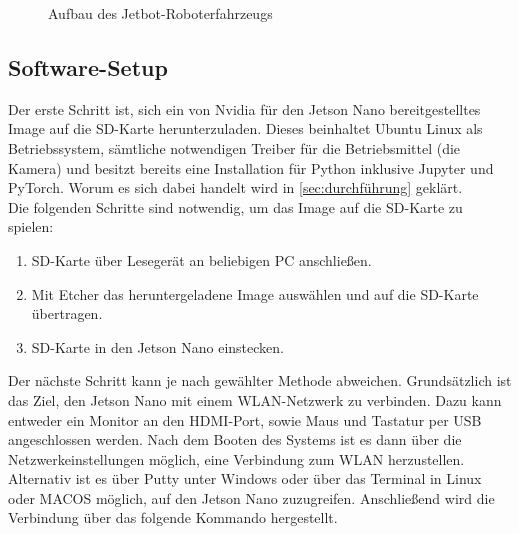 \begin{figure}[H]
    \centering
    \caption[Aufbau Jetbot]{Aufbau des Jetbot-Roboterfahrzeugs}
    \label{fig:Bild3.3}
\end{figure}

\subsection{Software-Setup}

Der erste Schritt ist, sich ein von Nvidia für den Jetson Nano bereitgestelltes Image auf die SD-Karte herunterzuladen. Dieses beinhaltet Ubuntu Linux als Betriebssystem, sämtliche notwendigen Treiber für die Betriebsmittel (\zB die Kamera) und besitzt bereits eine Installation für Python inklusive Jupyter und PyTorch. Worum es sich dabei handelt wird in \autoref{sec:durchführung} geklärt.\\
Die folgenden Schritte sind notwendig, um das Image auf die SD-Karte zu spielen:

\begin{enumerate}
    \item SD-Karte über Lesegerät an beliebigen PC anschließen.
    \item Mit Etcher das heruntergeladene Image auswählen und auf die SD-Karte übertragen.
    \item SD-Karte in den Jetson Nano einstecken.
\end{enumerate}

Der nächste Schritt kann je nach gewählter Methode abweichen. Grundsätzlich ist das Ziel, den Jetson Nano mit einem WLAN-Netzwerk zu verbinden. Dazu kann entweder ein Monitor an den HDMI-Port, sowie Maus und Tastatur per USB angeschlossen werden. Nach dem Booten des Systems ist es dann über die Netzwerkeinstellungen möglich, eine Verbindung zum WLAN herzustellen. Alternativ ist es über \zB Putty unter Windows oder über das Terminal in Linux oder MACOS möglich, auf den Jetson Nano zuzugreifen. Anschließend wird die Verbindung über das folgende Kommando hergestellt.\\

